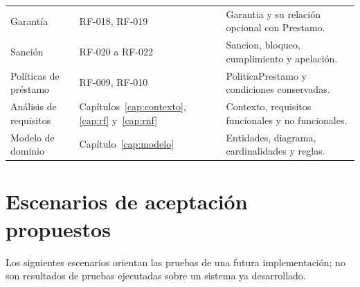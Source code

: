 \begin{longtable}{@{}>{\raggedright\arraybackslash}p{3.3cm}>{\raggedright\arraybackslash}p{4.4cm}>{\raggedright\arraybackslash}p{6.6cm}@{}}
Garant\'ia & RF-018, RF-019 & Garantia y su relaci\'on opcional con Prestamo. \\
Sanci\'on & RF-020 a RF-022 & Sancion, bloqueo, cumplimiento y apelaci\'on. \\
Pol\'iticas de pr\'estamo & RF-009, RF-010 & PoliticaPrestamo y condiciones conservadas. \\
An\'alisis de requisitos & Cap\'itulos~\ref{cap:contexto}, \ref{cap:rf} y~\ref{cap:rnf} & Contexto, requisitos funcionales y no funcionales. \\
Modelo de dominio & Cap\'itulo~\ref{cap:modelo} & Entidades, diagrama, cardinalidades y reglas. \\
\end{longtable}
\endgroup

\section{Escenarios de aceptaci\'on propuestos}

Los siguientes escenarios orientan las pruebas de una futura implementaci\'on; no son resultados de pruebas ejecutadas sobre un sistema ya desarrollado.

